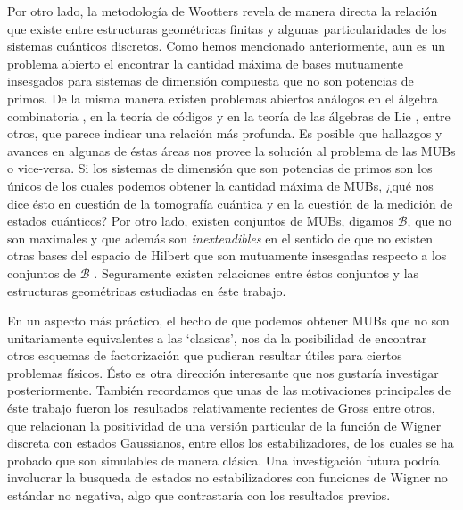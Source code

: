\documentclass[a4paper,11pt]{report}
\begin{document}
  Por otro lado, la metodología de Wootters revela de manera
  directa la relación que existe entre estructuras
  geométricas finitas y algunas particularidades de los
  sistemas cuánticos discretos. Como hemos mencionado
  anteriormente, aun es un problema abierto el encontrar la
  cantidad máxima de bases mutuamente insesgados para
  sistemas de dimensión compuesta que no son potencias de
  primos. De la misma manera existen problemas abiertos
  análogos en el álgebra combinatoria \cite{kantor2003}, en
  la teoría de códigos \cite{kantor1982} y en la teoría de
  las álgebras de Lie \cite{ivanov1987, kantor1996,
  boykin2005}, entre otros, que parece indicar una relación
  más profunda. Es posible que hallazgos y avances en
  algunas de éstas áreas nos provee la solución al problema
  de las MUBs o vice-versa. Si los sistemas de dimensión que
  son potencias de primos son los únicos de los cuales
  podemos obtener la cantidad máxima de MUBs, ¿qué nos dice
  ésto en cuestión de la tomografía cuántica y en la
  cuestión de la medición de estados cuánticos? Por otro
  lado, existen conjuntos de MUBs, digamos $\mathcal B$, que
  no son maximales y que además son \textit{inextendibles}
  en el sentido de que no existen otras bases del espacio de
  Hilbert que son mutuamente insesgadas respecto a los
  conjuntos de $\mathcal B$ \cite{garcia2021}. Seguramente
  existen relaciones entre éstos conjuntos y las estructuras
  geométricas estudiadas en éste trabajo. 

  En un aspecto más práctico, el hecho de que podemos
  obtener MUBs que no son unitariamente equivalentes a las
  `clasicas', nos da la posibilidad de encontrar otros
  esquemas de factorización que pudieran resultar útiles
  para ciertos problemas físicos. Ésto es otra dirección
  interesante que nos gustaría investigar posteriormente.
  También recordamos que unas de las motivaciones
  principales de éste trabajo fueron los resultados
  relativamente recientes de Gross \cite{gross2006} entre
  otros, que relacionan la positividad de una versión
  particular de la función de Wigner discreta con estados
  Gaussianos, entre ellos los estabilizadores, de los cuales
  se ha probado que son simulables de manera clásica. Una
  investigación futura podría involucrar la busqueda de
  estados no estabilizadores con funciones de Wigner no
  estándar no negativa, algo que contrastaría con los
  resultados previos.

  \newpage
  \appendix
  

  \newpage
  \printbibliography
\end{document}
